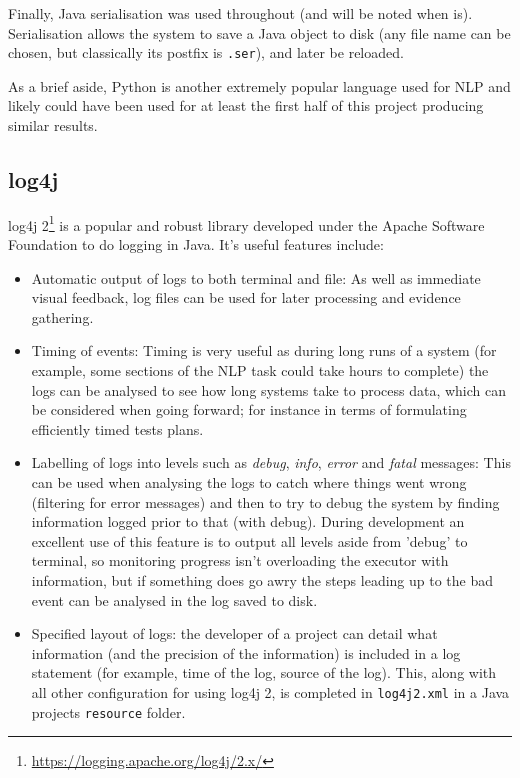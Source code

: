 Finally, Java serialisation was used throughout (and will be noted when is). Serialisation allows the system to save a Java object to disk (any file name can be chosen, but classically its postfix is \texttt{.ser}), and later be reloaded. 

As a brief aside, Python is another extremely popular language used for NLP and likely could have been used for at least the first half of this project producing similar results.

\subsection*{log4j}
log4j 2\footnote{\href{https://logging.apache.org/log4j/2.x/}{https://logging.apache.org/log4j/2.x/}} is a popular and robust library developed under the Apache Software Foundation to do logging in Java. It's useful features include:
\begin{itemize}
	\item Automatic output of logs to both terminal and file: As well as immediate visual feedback, log files can be used for later processing and evidence gathering.
	\item Timing of events: Timing is very useful as during long runs of a system (for example, some sections of the NLP task could take hours to complete) the logs can be analysed to see how long systems take to process data, which can be considered when going forward; for instance in terms of formulating efficiently timed tests plans.
	\item Labelling of logs into levels such as \textit{debug}, \textit{info}, \textit{error} and \textit{fatal} messages: This can be used when analysing the logs to catch where things went wrong (filtering for error messages) and then to try to debug the system by finding information logged prior to that (with debug). During development an excellent use of this feature is to output all levels aside from 'debug' to terminal, so monitoring progress isn't overloading the executor with information, but if something does go awry the steps leading up to the bad event can be analysed in the log saved to disk.
	\item Specified layout of logs: the developer of a project can detail what information (and the precision of the information) is included in a log statement (for example, time of the log, source of the log). This, along with all other configuration for using log4j 2, is completed in \texttt{log4j2.xml} in a Java projects \texttt{resource} folder.
\end{itemize}

